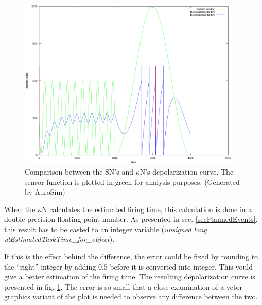 \begin{figure}[hb!tp]
	\centering
		\includegraphics[width=0.95\textwidth]{eps_Comparison_between_the_two_sensors__depol_FIKSA.eps}
	\caption{Comparison between the SN's and $\kappa$N's depolarization curve. The sensor function is plotted in green for analysis purposes. 
			(Generated by AuroSim)}
	\label{figComparisonBetweenSsensorAndKsensorDepolCurveFIXEdError}
\end{figure}

When the $\kappa$N calculates the estimated firing time, this calculation is done in a double precision floating point number. 
As presented in sec. \ref{secPlannedEvents}, this result has to be casted to an integer variable (\emph{unsigned long ulEstimatedTaskTime\_for\_object}).

If this is the effect behind the difference, the error could be fixed by rounding to the ``right'' integer by adding $0.5$ before it is converted into integer.
This vould give a better estimation of the firing time.
The resulting depolarization curve is presented in fig. \ref{figComparisonBetweenSsensorAndKsensorDepolCurveFIXEdError}.
The error is so small that a close examination of a vetor graphics variant of the plot is needed to observe any difference between the two.

